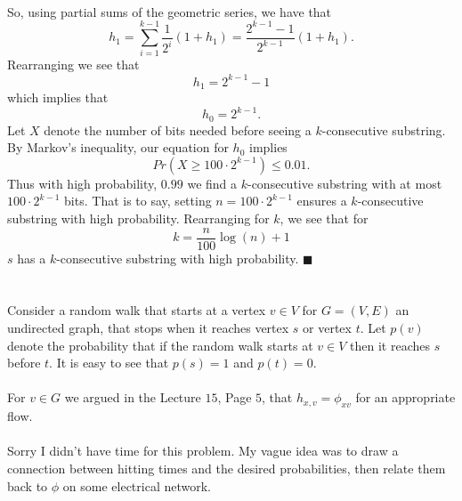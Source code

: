 \documentclass[letterpaper,12pt,oneside,onecolumn]{article}
\begin{document}
\paragraph{}
So, using partial sums of the geometric series, we have that 
$$h_1 = \sum_{i=1}^{k-1} \frac{1}{2^i}(1+h_1) = \frac{2^{k-1}-1}{2^{k-1}}(1+h_1).$$
Rearranging we see that
$$h_1 = 2^{k-1} - 1$$
which implies that
$$h_0 = 2^{k-1}.$$
Let $X$ denote the number of bits needed before seeing a $k$-consecutive substring. By Markov's inequality, our equation for $h_0$ implies
$$Pr(X \geq 100\cdot2^{k-1}) \leq 0.01.$$
Thus with high probability, $0.99$ we find a $k$-consecutive substring with at most $100 \cdot 2^{k-1}$ bits. That is to say, setting $n = 100\cdot 2^{k-1}$ ensures a $k$-consecutive substring with high probability. Rearranging for $k$, we see that for
$$k =\frac{n}{100}\log(n) + 1$$
$s$ has a $k$-consecutive substring with high probability. $\blacksquare$
\newpage
\section{}
\paragraph{}
Consider a random walk that starts at a vertex $v \in V$ for $G=(V,E)$ an undirected graph, that stops when it reaches vertex $s$ or vertex $t$. Let $p(v)$ denote the probability that if the random walk starts at $v \in V$ then it reaches $s$ before $t$. It is easy to see that $p(s) = 1$ and $p(t) = 0$.
\paragraph{}
For $v \in G$ we argued in the Lecture $15$, Page $5$, that $h_{x,v} = \phi_{xv}$ for an appropriate flow.
\paragraph{}
Sorry I didn't have time for this problem. My vague idea was to draw a connection between hitting times and the desired probabilities, then relate them back to $\phi$ on some electrical network.
\newpage
\section{}
\end{document}
